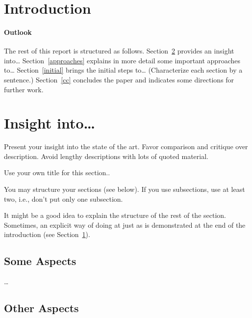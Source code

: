 \documentclass[11pt,english,a4paper,twoside]{article}
\title{\reporttitle}
\author{Peter Bartoš, Stanislav Krištof} %
\date{Faculty of Informatics and Information Technologies\\
      Slovak University of Technology in Bratislava\\[6pt]
      \today}
\begin{document}
\maketitle




\section{Introduction} \label{in}


\paragraph{Outlook}
The rest of this report is structured as follows. Section~\ref{insight} provides
an insight into\ldots{} Section~\ref{approaches} explains in more detail some
important approaches to\ldots{} Section~\ref{initial} brings the initial steps
to\ldots{} (Characterize each section by a sentence.) Section~\ref{cc}
concludes the paper and indicates some directions for further work.



\section{Insight into\ldots} \label{insight}




Present your insight into the state of the art.
Favor comparison and critique over description.
Avoid lengthy descriptions with lots of quoted material.

Use your own title for this section..

You may structure your sections (see below).
If you use subsections, use at least two, i.e., don't put only one subsection.

It might be a good idea to explain the structure of the rest of the section.
Sometimes, an explicit way of doing at just as is demonstrated at the end of the
introduction (see Section~\ref{in}).


\subsection{Some Aspects} \label{insight-some}

\ldots

\subsection{Other Aspects} \label{insight-other}
\end{document}
